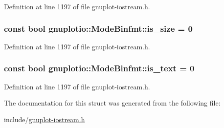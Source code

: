 Definition at line 1197 of file gnuplot-\/iostream.\+h.

\subsubsection[{\texorpdfstring{is\+\_\+size}{is_size}}]{\setlength{\rightskip}{0pt plus 5cm}const bool gnuplotio\+::\+Mode\+Binfmt\+::is\+\_\+size = 0\hspace{0.3cm}{\ttfamily [static]}}\hypertarget{structgnuplotio_1_1_mode_binfmt_a40a5a8ee815d6a5e9a3c30c8290a6967}{}\label{structgnuplotio_1_1_mode_binfmt_a40a5a8ee815d6a5e9a3c30c8290a6967}


Definition at line 1197 of file gnuplot-\/iostream.\+h.

\subsubsection[{\texorpdfstring{is\+\_\+text}{is_text}}]{\setlength{\rightskip}{0pt plus 5cm}const bool gnuplotio\+::\+Mode\+Binfmt\+::is\+\_\+text = 0\hspace{0.3cm}{\ttfamily [static]}}\hypertarget{structgnuplotio_1_1_mode_binfmt_a7ab187fe922cac23b0d39ade81e5eb56}{}\label{structgnuplotio_1_1_mode_binfmt_a7ab187fe922cac23b0d39ade81e5eb56}


Definition at line 1197 of file gnuplot-\/iostream.\+h.



The documentation for this struct was generated from the following file\+:\begin{DoxyCompactItemize}
\item 
include/\hyperlink{gnuplot-iostream_8h}{gnuplot-\/iostream.\+h}\end{DoxyCompactItemize}
